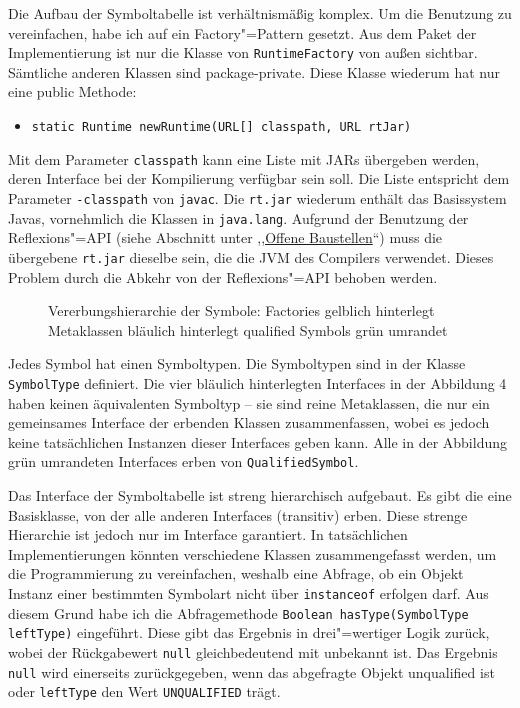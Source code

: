 \documentclass[10pt,a4paper,ngerman,titlepage,tocindentauto]{scrartcl}
\begin{document}
			Die Aufbau der Symboltabelle ist verhältnismäßig komplex. Um die Benutzung zu vereinfachen, habe ich
			auf ein Factory"=Pattern gesetzt. Aus dem Paket der Implementierung ist nur die Klasse von \texttt{RuntimeFactory}
			von außen sichtbar. Sämtliche anderen Klassen sind package-private. Diese Klasse wiederum hat nur eine
			public Methode:
			\begin{itemize}
				\item \verb|static Runtime newRuntime(URL[] classpath, URL rtJar)|
			\end{itemize}
			Mit dem Parameter \texttt{classpath} kann eine Liste mit JARs übergeben werden, deren Interface bei der Kompilierung
			verfügbar sein soll. Die Liste entspricht dem Parameter \texttt{-classpath} von \texttt{javac}.
			Die \texttt{rt.jar} wiederum enthält das Basissystem Javas, vornehmlich die Klassen in \texttt{java.lang}.
			Aufgrund der Benutzung der Reflexions"=API (siehe Abschnitt unter ,,\hyperlink{Offene_Baustellen_Symboltabelle}{Offene Baustellen}``)
			muss die übergebene \texttt{rt.jar} dieselbe sein, die die JVM des Compilers verwendet.
			Dieses Problem durch die Abkehr von der Reflexions"=API behoben werden.
			
			\begin{wrapfigure}{R}{0.5\textwidth}
				\caption[Vererbungshierarchie der Symbole]{Vererbungshierarchie der Symbole: \newline
					Factories gelblich hinterlegt \newline
					Metaklassen bläulich hinterlegt \newline
					qualified Symbols grün umrandet}
			\end{wrapfigure}
			
			Jedes Symbol hat einen Symboltypen. Die Symboltypen sind in der Klasse \texttt{SymbolType} definiert.
			Die vier bläulich hinterlegten Interfaces in der Abbildung 4 haben keinen äquivalenten Symboltyp -- sie sind
			reine Metaklassen, die nur ein gemeinsames Interface der erbenden Klassen zusammenfassen, wobei
			es jedoch keine tatsächlichen Instanzen dieser Interfaces geben kann. Alle in der Abbildung grün umrandeten
			Interfaces erben von \texttt{QualifiedSymbol}.
			
			Das Interface der Symboltabelle ist streng hierarchisch aufgebaut. Es gibt die eine Basisklasse, von der
			alle anderen Interfaces (transitiv) erben. Diese strenge Hierarchie ist jedoch nur im Interface
			garantiert. In tatsächlichen Implementierungen könnten verschiedene Klassen zusammengefasst werden, um
			die Programmierung zu vereinfachen, weshalb eine Abfrage, ob ein Objekt Instanz einer bestimmten Symbolart
			nicht über \texttt{instanceof} erfolgen darf. Aus diesem Grund habe ich die Abfragemethode
			\verb|Boolean hasType(SymbolType leftType)| eingeführt. Diese gibt das Ergebnis in drei"=wertiger Logik
			zurück, wobei der Rückgabewert \texttt{null} gleichbedeutend mit unbekannt ist. Das Ergebnis \texttt{null}
			wird einerseits zurückgegeben, wenn das abgefragte Objekt unqualified ist oder \texttt{leftType} den Wert
			\texttt{UNQUALIFIED} trägt.
			
\end{document}
